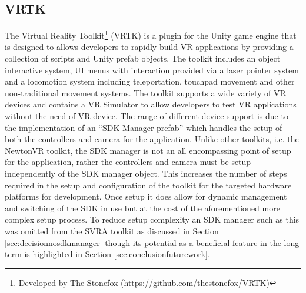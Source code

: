 \documentclass{l4proj}
\begin{document}
\subsection{VRTK}
\label{sec:contextvrtk}
The Virtual Reality Toolkit\footnote{Developed by The Stonefox (\url{https://github.com/thestonefox/VRTK})} (VRTK) is a plugin for the Unity game engine that is designed to allows developers to rapidly build VR applications by providing a collection of scripts and Unity prefab objects. The toolkit includes an object interactive system, UI menus with interaction provided via a laser pointer system and a locomotion system including teleportation, touchpad movement and other non-traditional movement systems. The toolkit supports a wide variety of VR devices and contains a VR Simulator to allow developers to test VR applications without the need of VR device. The range of different device support is due to the implementation of an ``SDK Manager prefab'' which handles the setup of both the controllers and camera for the application. Unlike other toolkits, i.e. the NewtonVR toolkit, the SDK manager is not an all encompassing point of setup for the application, rather the controllers and camera must be setup independently of the SDK manager object. This increases the number of steps required in the setup and configuration of the toolkit for the targeted hardware platforms for development. Once setup it does allow for dynamic management and switching of the SDK in use but at the cost of the aforementioned more complex setup process. To reduce setup complexity an SDK manager such as this was omitted from the SVRA toolkit as discussed in Section \ref{sec:decisionnosdkmanager} though its potential as a beneficial feature in the long term is highlighted in Section \ref{sec:conclusionfuturework}.
\end{document}
